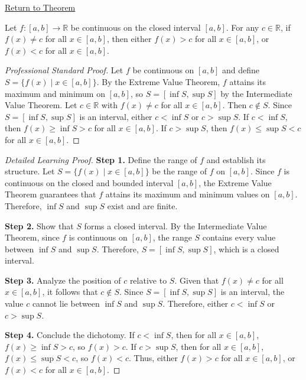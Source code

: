 \newpage
{}
\label{prf:darboux-property}

\begin{remark*}[Return]
\hyperref[thm:darboux-property]{Return to Theorem}
\end{remark*}

\begin{theorem*}
Let $f : [a, b] \to \mathbb{R}$ be continuous on the closed interval $[a, b]$. For any $c \in \mathbb{R}$, if $f(x) \neq c$ for all $x \in [a, b]$, then either $f(x) > c$ for all $x \in [a, b]$, or $f(x) < c$ for all $x \in [a, b]$.
\end{theorem*}

\begin{proof}[Professional Standard Proof]
\LRAProofBodyStart
Let $f$ be continuous on $[a, b]$ and define $S = \{f(x) \mid x \in [a, b]\}$. By the Extreme Value Theorem, $f$ attains its maximum and minimum on $[a, b]$, so $S = [\inf S, \sup S]$ by the Intermediate Value Theorem. Let $c \in \mathbb{R}$ with $f(x) \neq c$ for all $x \in [a, b]$. Then $c \notin S$. Since $S = [\inf S, \sup S]$ is an interval, either $c < \inf S$ or $c > \sup S$. If $c < \inf S$, then $f(x) \geq \inf S > c$ for all $x \in [a, b]$. If $c > \sup S$, then $f(x) \leq \sup S < c$ for all $x \in [a, b]$.
\end{proof}

\begin{proof}[Detailed Learning Proof]
\LRAProofBodyStart

\textbf{Step 1.} Define the range of $f$ and establish its structure. Let $S = \{f(x) \mid x \in [a, b]\}$ be the range of $f$ on $[a, b]$. Since $f$ is continuous on the closed and bounded interval $[a, b]$, the Extreme Value Theorem guarantees that $f$ attains its maximum and minimum values on $[a, b]$. Therefore, $\inf S$ and $\sup S$ exist and are finite.

\textbf{Step 2.} Show that $S$ forms a closed interval. By the Intermediate Value Theorem, since $f$ is continuous on $[a, b]$, the range $S$ contains every value between $\inf S$ and $\sup S$. Therefore, $S = [\inf S, \sup S]$, which is a closed interval.

\textbf{Step 3.} Analyze the position of $c$ relative to $S$. Given that $f(x) \neq c$ for all $x \in [a, b]$, it follows that $c \notin S$. Since $S = [\inf S, \sup S]$ is an interval, the value $c$ cannot lie between $\inf S$ and $\sup S$. Therefore, either $c < \inf S$ or $c > \sup S$.

\textbf{Step 4.} Conclude the dichotomy. If $c < \inf S$, then for all $x \in [a, b]$, $f(x) \geq \inf S > c$, so $f(x) > c$. If $c > \sup S$, then for all $x \in [a, b]$, $f(x) \leq \sup S < c$, so $f(x) < c$. Thus, either $f(x) > c$ for all $x \in [a, b]$, or $f(x) < c$ for all $x \in [a, b]$.
\end{proof}

